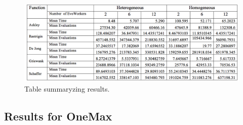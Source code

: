 \documentclass{llncs}
\begin{document}
\begin{figure}[t]
    \centering
        \includegraphics[width=4.5in]{img/table.png}
    \caption{Table summaryzing results. }
    \label{fig:summary}
\end{figure}

\subsection{Results for OneMax}
\end{document}
